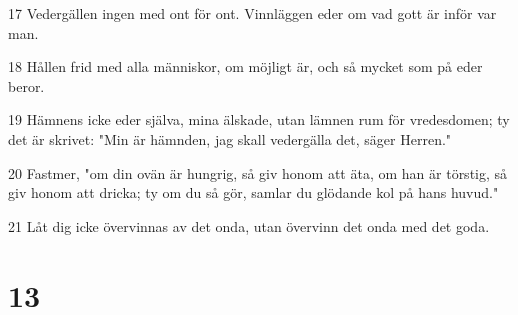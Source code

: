 \par 17 Vedergällen ingen med ont för ont. Vinnläggen eder om vad gott är inför var man.
\par 18 Hållen frid med alla människor, om möjligt är, och så mycket som på eder beror.
\par 19 Hämnens icke eder själva, mina älskade, utan lämnen rum för vredesdomen; ty det är skrivet: "Min är hämnden, jag skall vedergälla det, säger Herren."
\par 20 Fastmer, "om din ovän är hungrig, så giv honom att äta, om han är törstig, så giv honom att dricka; ty om du så gör, samlar du glödande kol på hans huvud."
\par 21 Låt dig icke övervinnas av det onda, utan övervinn det onda med det goda.

\chapter{13}

